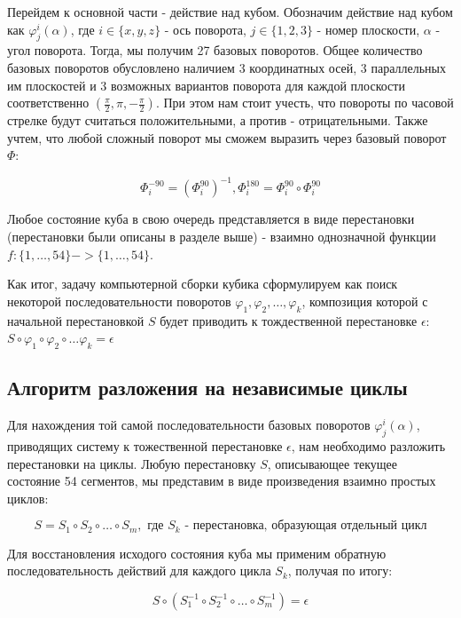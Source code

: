 \documentclass{article}
\begin{document}
Перейдем к основной части - действие над кубом. Обозначим действие над кубом как $\varphi_{j}^i(\alpha)$, где $i\in\{x, y, z\}$ - ось поворота, $j\in\{1, 2, 3\}$ - номер плоскости, $\alpha$ - угол поворота. Тогда, мы получим 27 базовых поворотов. Общее количество базовых поворотов обусловлено наличием 3 координатных осей, 3 параллельных им плоскостей и 3 возможных вариантов поворота для каждой плоскости соответственно $(\frac{\pi}{2}, \pi, -\frac{\pi}{2})$. При этом нам стоит учесть, что повороты по часовой стрелке будут считаться положительными, а против - отрицательными. Также учтем, что любой сложный поворот мы сможем выразить через базовый поворот $\Phi$:

\begin{equation}
\Phi_{i}^{-90} = (\Phi_{i}^{90})^{-1}, \Phi_{i}^{180} = \Phi_{i}^{90}\circ\Phi_{i}^{90}
\end{equation}

Любое состояние куба в свою очередь представляется в виде перестановки (перестановки были описаны в разделе выше) - взаимно однозначной функции $f:\{1, \dots, 54\} -> \{1, \dots, 54\}$.

Как итог, задачу компьютерной сборки кубика сформулируем как поиск некоторой последовательности поворотов $\varphi_1, \varphi_2, \dots, \varphi_k$, композиция которой с начальной перестановкой $S$ будет приводить к тождественной перестановке $\epsilon$: $S\circ \varphi_1\circ\varphi_2\circ\dots\varphi_k = \epsilon$

\subsection{Алгоритм разложения на независимые циклы}
Для нахождения той самой последовательности базовых поворотов $\varphi_{j}^{i}(\alpha)$, приводящих систему к тожественной перестановке $\epsilon$, нам необходимо разложить перестановки на циклы. Любую перестановку $S$, описывающее текущее состояние 54 сегментов, мы представим в виде произведения взаимно простых циклов:

\begin{equation}
S = S_1\circ S_2\circ\dots\circ S_m,\text{ где $S_{k}$ - перестановка, образующая отдельный цикл}
\end{equation}

Для восстановления исходого состояния куба мы применим обратную последовательность действий для каждого цикла $S_k$, получая по итогу:

\begin{equation}
S\circ(S_1^{-1}\circ S_2^{-1}\circ\dots\circ S_m^{-1}) = \epsilon
\end{equation}
\end{document}
